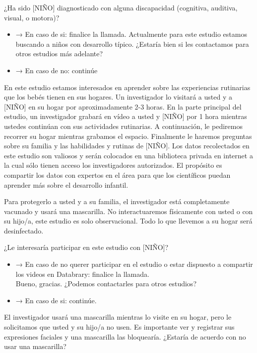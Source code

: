 \documentclass[
  12pt,
]{book}
\providecommand{\tightlist}{%
  \setlength{\itemsep}{0pt}\setlength{\parskip}{0pt}}
\begin{document}
¿Ha sido {[}NIÑO{]} diagnosticado con alguna discapacidad (cognitiva, auditiva, visual, o motora)?

\begin{itemize}
\tightlist
\item
  → En caso de si: finalice la llamada. Actualmente para este estudio estamos buscando a niños con desarrollo típico. ¿Estaría bien si les contactamos para otros estudios más adelante?
\item
  → En caso de no: continúe
\end{itemize}

En este estudio estamos interesados en aprender sobre las experiencias rutinarias que los bebés tienen en sus hogares. Un investigador lo visitará a usted y a {[}NIÑO{]} en su hogar por aproximadamente 2-3 horas. En la parte principal del estudio, un investigador grabará en vídeo a usted y {[}NIÑO{]} por 1 hora mientras ustedes continúan con sus actividades rutinarias. A continuación, le pediremos recorrer su hogar mientras grabamos el espacio. Finalmente le haremos preguntas sobre su familia y las habilidades y rutinas de {[}NIÑO{]}. Los datos recolectados en este estudio son valiosos y serán colocados en una biblioteca privada en internet a la cual sólo tienen acceso los investigadores autorizados. El propósito es compartir los datos con expertos en el área para que los científicos puedan aprender más sobre el desarrollo infantil.

Para protegerlo a usted y a su familia, el investigador está completamente vacunado y usará una mascarilla. No interactuaremos físicamente con usted o con su hijo/a, este estudio es solo observacional. Todo lo que llevemos a su hogar será desinfectado.

¿Le interesaría participar en este estudio con {[}NIÑO{]}?

\begin{itemize}
\tightlist
\item
  → En caso de no querer participar en el estudio o estar dispuesto a compartir los videos en Databrary: finalice la llamada.\\
  Bueno, gracias. ¿Podemos contactarles para otros estudios?
\item
  → En caso de si: continúe.
\end{itemize}

El investigador usará una mascarilla mientras lo visite en su hogar, pero le solicitamos que usted y su hijo/a no usen. Es importante ver y registrar sus expresiones faciales y una mascarilla las bloquearía. ¿Estaría de acuerdo con no usar una mascarilla?
\end{document}
